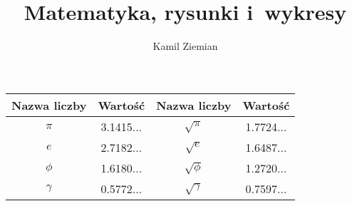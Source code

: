 \documentclass[a4paper,11pt]{article}
\title{Matematyka, rysunki i~wykresy}
\author{Kamil Ziemian}
\begin{document}





\maketitle %



\begin{center}

  \begin{tabular}{|c|c|c|c|}
    \hline
    Nazwa liczby & Wartość & Nazwa liczby & Wartość \\
    \hline
    $\pi$ & 3.1415... & $\sqrt{ \pi }$ & 1.7724... \\
    $e$ & 2.7182... & $\sqrt{ e }$ & 1.6487... \\
    $\phi$ & 1.6180... & $\sqrt{ \phi }$ & 1.2720... \\
    $\gamma$ & 0.5772... & $\sqrt{ \gamma }$ & 0.7597... \\
    \hline
  \end{tabular}

\end{center}
\end{document}
